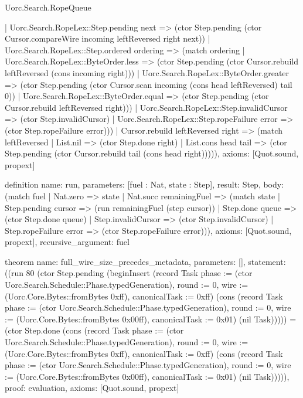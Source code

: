 \begin{lexlean}{Uorc.Search.RopeQueue}
\begin{semanticmodule}
{        | Uorc.Search.RopeLex::Step.pending next => (ctor Step.pending (ctor Cursor.compareWire incoming leftReversed right next))
        | Uorc.Search.RopeLex::Step.ordered ordering => (match ordering
          | Uorc.Search.RopeLex::ByteOrder.less => (ctor Step.pending (ctor Cursor.rebuild leftReversed (cons incoming right)))
          | Uorc.Search.RopeLex::ByteOrder.greater => (ctor Step.pending (ctor Cursor.scan incoming (cons head leftReversed) tail 0))
          | Uorc.Search.RopeLex::ByteOrder.equal => (ctor Step.pending (ctor Cursor.rebuild leftReversed right)))
        | Uorc.Search.RopeLex::Step.invalidCursor => (ctor Step.invalidCursor)
        | Uorc.Search.RopeLex::Step.ropeFailure error => (ctor Step.ropeFailure error)))
    | Cursor.rebuild leftReversed right => (match leftReversed
      | List.nil => (ctor Step.done right)
      | List.cons head tail => (ctor Step.pending (ctor Cursor.rebuild tail (cons head right))))),
  axioms: [Quot.sound, propext]
}

definition{
  name: run,
  parameters: [fuel : Nat, state : Step],
  result: Step,
  body: (match fuel
    | Nat.zero => state
    | Nat.succ remainingFuel => (match state
      | Step.pending cursor => (run remainingFuel (step cursor))
      | Step.done queue => (ctor Step.done queue)
      | Step.invalidCursor => (ctor Step.invalidCursor)
      | Step.ropeFailure error => (ctor Step.ropeFailure error))),
  axioms: [Quot.sound, propext],
  recursive_argument: fuel
}

theorem{
  name: full_wire_size_precedes_metadata,
  parameters: [],
  statement: ((run 80 (ctor Step.pending (beginInsert (record Task {phase := (ctor Uorc.Search.Schedule::Phase.typedGeneration), round := 0, wire := (Uorc.Core.Bytes::fromBytes 0xff), canonicalTask := 0xff}) (cons (record Task {phase := (ctor Uorc.Search.Schedule::Phase.typedGeneration), round := 0, wire := (Uorc.Core.Bytes::fromBytes 0x00ff), canonicalTask := 0x01}) (nil Task))))) = (ctor Step.done (cons (record Task {phase := (ctor Uorc.Search.Schedule::Phase.typedGeneration), round := 0, wire := (Uorc.Core.Bytes::fromBytes 0xff), canonicalTask := 0xff}) (cons (record Task {phase := (ctor Uorc.Search.Schedule::Phase.typedGeneration), round := 0, wire := (Uorc.Core.Bytes::fromBytes 0x00ff), canonicalTask := 0x01}) (nil Task))))),
  proof: evaluation{},
  axioms: [Quot.sound, propext]
}


\end{semanticmodule}
\end{lexlean}
